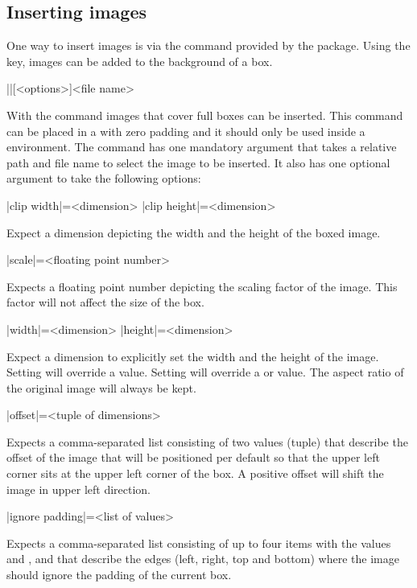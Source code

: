 \documentclass[a4paper]{article}
\begin{document}
\subsection{Inserting images}

One way to insert images is via the  command provided by the  package. Using the  key, images can be added to the background of a box.

\begin{macrodef}
|\leporelloimage|[<options>]{<file name>}
\end{macrodef}
With the command \macro{\leporelloimage} images that cover full boxes can be inserted. This command can be placed in a  with zero padding and it should only be used inside a  environment. The command has one mandatory argument that takes a relative path and file name to select the image to be inserted. It also has one optional argument to take the following options:

\begin{macrodef}
|clip width|={<dimension>}
|clip height|={<dimension>}
\end{macrodef}
Expect a dimension depicting the width and the height of the boxed image.

\begin{macrodef}
|scale|={<floating point number>}
\end{macrodef}
Expects a floating point number depicting the scaling factor of the image. This factor will not affect the size of the box.

\begin{macrodef}
|width|={<dimension>}
|height|={<dimension>}
\end{macrodef}
Expect a dimension to explicitly set the width and the height of the image. Setting  will override a  value. Setting  will override a  or  value. The aspect ratio of the original image will always be kept.

\begin{macrodef}
|offset|={<tuple of dimensions>}
\end{macrodef}
Expects a comma-separated list consisting of two values (tuple) that describe the offset of the image that will be positioned per default so that the upper left corner sits at the upper left corner of the box. A positive offset will shift the image in upper left direction.

\begin{macrodef}
|ignore padding|={<list of values>}
\end{macrodef}
Expects a comma-separated list consisting of up to four items with the values  and ,  and  that describe the edges (left, right, top and bottom) where the image should ignore the padding of the current box.
\end{document}
